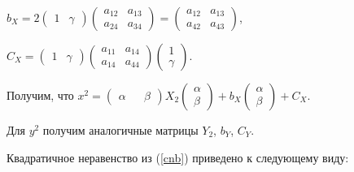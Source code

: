 \documentclass[pdftex,ptm,12pt,a4paper]{report}
\begin{document}
\begin{enumerate}
        $b_X = 2\begin{pmatrix} 1 & \gamma \end{pmatrix} 
          \begin{pmatrix} 
              a_{12} & a_{13} \\ 
              a_{24} & a_{34} 
        \end{pmatrix} = 
        \begin{pmatrix} 
              a_{12} & a_{13} \\ 
              a_{42} & a_{43} 
        \end{pmatrix}$,

        $C_X = \begin{pmatrix} 1 & \gamma \end{pmatrix} 
          \begin{pmatrix} 
              a_{11} & a_{14} \\ 
              a_{14} & a_{44} 
        \end{pmatrix}
        \begin{pmatrix} 1 \\ \gamma \end{pmatrix}$.

      Получим, что 
      $x^2 = \begin{pmatrix} \alpha && \beta \end{pmatrix}
               X_2
             \begin{pmatrix} \alpha \\ \beta \end{pmatrix} +
             b_X \begin{pmatrix} \alpha \\ \beta \end{pmatrix}  +
             C_X$.

      Для $y^2$ получим аналогичные матрицы $Y_2$, $b_Y$, $C_Y$.

      Квадратичное неравенство из (\ref{cnb}) приведено к следующему виду:


\end{enumerate}
\end{document}
